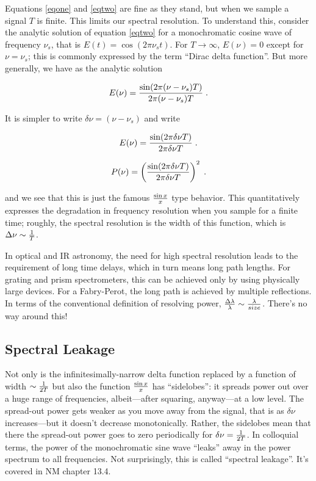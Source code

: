 \documentclass[psfig,preprint]{aastex}
\begin{document}
        Equations \ref{eqone} and \ref{eqtwo} are fine as they stand,
but when we sample a signal $T$ is finite. This limits our spectral
resolution. To understand this, consider the analytic solution of
equation \ref{eqtwo} for a monochromatic cosine wave of frequency
$\nu_s$, that is $E(t) = \cos(2 \pi \nu_s t)$.  For $T \rightarrow
\infty$, $E(\nu) = 0$ except for $\nu = \nu_s$; this is commonly
expressed by the term ``Dirac delta function''.  But more generally, we
have as the analytic solution

\begin{equation} \label{sinxoverx}
E(\nu) = {\sin (2 \pi (\nu - \nu_s) T) \over 2 \pi (\nu - \nu_s)
T} \; .  
\end{equation}

\noindent It is simpler to write $\delta \nu = (\nu - \nu_s)$ and write

\begin{equation}
E(\nu) = {\sin (2 \pi \delta \nu T) \over 2 \pi \delta \nu T} \; .
\end{equation}

\begin{equation}
P(\nu) = \left ({\sin (2 \pi \delta \nu T) \over 2 \pi \delta \nu T}
\right)^2 \; .
\end{equation}

\noindent and we see that this is just the famous $\sin x \over x$ type
behavior.  This quantitatively expresses the degradation in frequency
resolution when you sample for a finite time; roughly, the spectral
resolution is the width of this function, which is $\Delta \nu \sim {1
\over T}$.

	In optical and IR astronomy, the need for high spectral
resolution leads to the requirement of long time delays, which in turn
means long path lengths. For grating and prism spectrometers, this can
be achieved only by using physically large devices. For a Fabry-Perot,
the long path is achieved by multiple reflections. In terms of the
conventional definition of resolving power, ${\Delta \lambda \over
\lambda} \sim {\lambda \over size}$. There's no way around this!

\subsection{Spectral Leakage}

	Not only is the infinitesimally-narrow delta function replaced by
a function of width $\sim {1 \over 2T}$ but also the function $\sin x
\over x$ has ``sidelobes'': it spreads power out over a huge range of
frequencies, albeit---after squaring, anyway---at a low level.  The
spread-out power gets weaker as you move away from the signal, that is
as $\delta \nu$ increases---but it doesn't decrease monotonically. 
Rather, the    sidelobes mean that there the spread-out power goes to
zero periodically for $\delta \nu = {1 \over 2T}$.  In colloquial terms,
the power of the monochromatic sine wave ``leaks'' away in the power
spectrum to all frequencies.  Not surprisingly, this is called
``spectral leakage''. It's covered in NM chapter 13.4.
\end{document}
